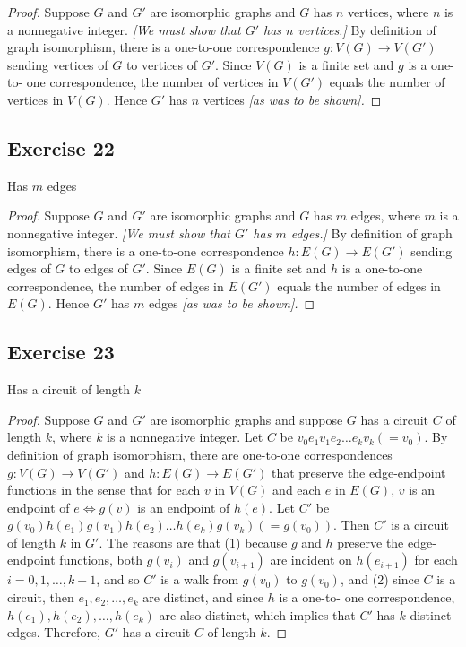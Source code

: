 \documentclass[14pt]{extarticle}
\begin{document}
\begin{proof}
Suppose \(G\) and \(G'\) are isomorphic graphs and \(G\) has \(n\) vertices, where \(n\) is a nonnegative integer. {\it [We 
must show that \(G'\) has \(n\) vertices.]} By definition of graph isomorphism, there is a one-to-one correspondence \(g: 
V(G) \to V(G')\) sending vertices of \(G\) to vertices of \(G'\). Since \(V(G)\) is a finite set and \(g\) is a one-to-
one correspondence, the number of vertices in \(V(G')\) equals the number of vertices in \(V(G)\). Hence \(G'\) has \(n\) 
vertices {\it [as was to be shown].}
\end{proof}

\subsection{Exercise 22}
Has \(m\) edges

\begin{proof}
Suppose \(G\) and \(G'\) are isomorphic graphs and \(G\) has \(m\) edges, where \(m\) is a nonnegative integer. {\it [We 
must show that \(G'\) has \(m\) edges.]} By definition of graph isomorphism, there is a one-to-one correspondence \(h: 
E(G) \to E(G')\) sending edges of \(G\) to edges of \(G'\). Since \(E(G)\) is a finite set and \(h\) is a one-to-one 
correspondence, the number of edges in \(E(G')\) equals the number of edges in \(E(G)\). Hence \(G'\) has \(m\) edges 
{\it [as was to be shown].}
\end{proof}

\subsection{Exercise 23}
Has a circuit of length \(k\)

\begin{proof}
Suppose \(G\) and \(G'\) are isomorphic graphs and suppose \(G\) has a circuit \(C\) of length \(k\), where \(k\) is a 
nonnegative integer. Let \(C\) be \(v_0e_1v_1e_2 \ldots e_kv_k(=v_0)\). By definition of graph isomorphism, there are 
one-to-one correspondences \(g: V(G) \to V(G')\) and \(h: E(G) \to E(G')\) that preserve the edge-endpoint functions in the 
sense that for each \(v\) in \(V(G)\) and each \(e\) in \(E(G)\), \(v\) is an endpoint of \(e \iff g(v)\) is an endpoint of 
\(h(e)\). Let \(C'\) be \(g(v_0)h(e_1)g(v_1)h(e_2) \ldots h(e_k)g(v_k)(=g(v_0))\). Then \(C'\) is a circuit of length 
\(k\) in \(G'\). The reasons are that (1) because \(g\) and \(h\) preserve the edge-endpoint functions, both \(g(v_i)\) and 
\(g(v_{i + 1})\) are incident on \(h(e_{i + 1})\) for each \(i = 0, 1, \ldots, k-1\), and so \(C'\) is a walk from \(g(v_0)\) 
to \(g(v_0)\), and (2) since \(C\) is a circuit, then \(e_1, e_2, \ldots, e_k\) are distinct, and since \(h\) is a one-to-
one correspondence, \(h(e_1), h(e_2), \ldots, h(e_k)\) are also distinct, which implies that \(C'\) has \(k\) distinct 
edges. Therefore, \(G'\) has a circuit \(C\) of length \(k\).
\end{proof}
\end{document}
